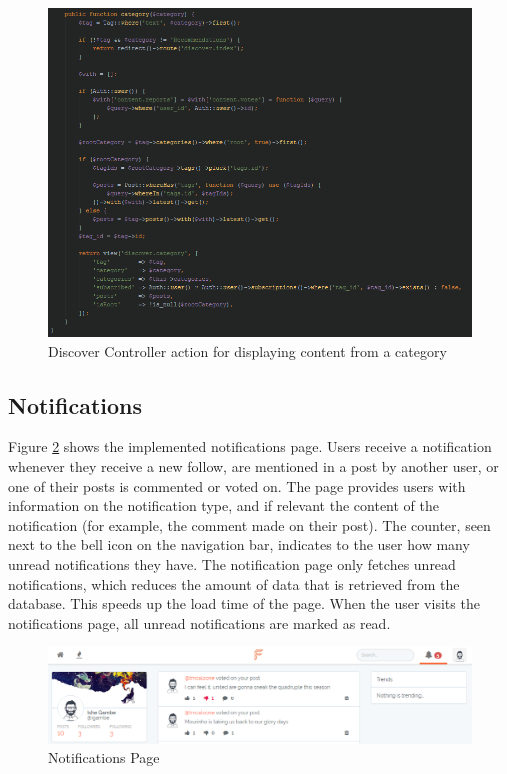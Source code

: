 \begin{figure}[H]
\centering
\includegraphics[width=\textwidth]{Images/Implementation/DiscoverControllerCategory}
\caption{Discover Controller action for displaying content from a category}
\label{fig:DiscoverControllerCategory}
\end{figure}

\subsection{Notifications}
Figure \ref{fig:NotificationsPage} shows the implemented notifications page. Users receive a notification whenever they receive a new follow, are mentioned in a post by another user, or one of their posts is commented or voted on. The page provides users with information on the notification type, and if relevant the content of the notification (for example, the comment made on their post). The counter, seen next to the bell icon on the navigation bar, indicates to the user how many unread notifications they have. The notification page only fetches unread notifications, which reduces the amount of data that is retrieved from the database. This speeds up the load time of the page. When the user visits the notifications page, all unread notifications are marked as read. 

\begin{figure}[H]
\centering
\includegraphics[width=\textwidth]{Images/Implementation/NotificationsPage}
\caption{Notifications Page}
\label{fig:NotificationsPage}
\end{figure}

